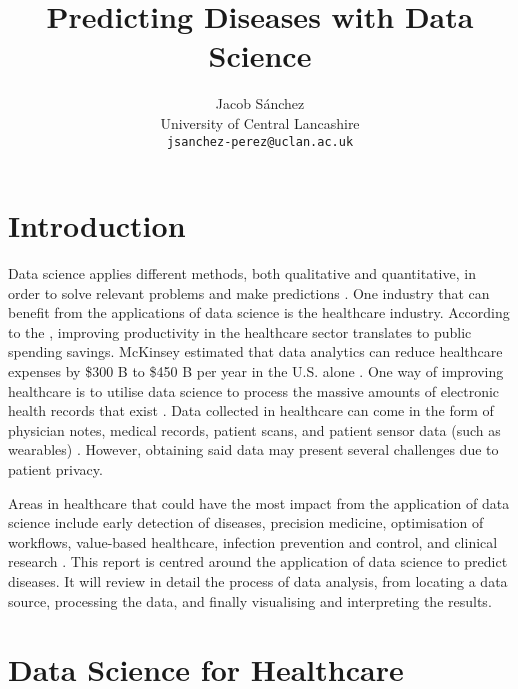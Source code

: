 \documentclass[a4paper,12pt]{article}
\title{Predicting Diseases with Data Science}
\author{Jacob Sánchez\\ University of Central Lancashire\\\texttt{jsanchez-perez@uclan.ac.uk}}
\date{}
\begin{document}
\maketitle


\section{Introduction}



Data science applies different methods, both qualitative and quantitative, in order to solve relevant problems and make predictions \parencite[78]{Waller2013}.
One industry that can benefit from the applications of data science is the healthcare industry.
According to the \textcite{oecd2010health}, improving productivity in the healthcare sector translates to public spending savings.
McKinsey estimated that data analytics can reduce healthcare expenses by \$300 B to \$450 B per year in the U.S. alone \parencite{Groves2013}.
One way of improving healthcare is to utilise data science to process the massive amounts of electronic health records that exist \parencite{Dalianis2015}.
Data collected in healthcare can come in the form of physician notes, medical records, patient scans, and patient sensor data (such as wearables) \parencite{Adam2017}.
However, obtaining said data may present several challenges due to patient privacy. 

Areas in healthcare that could have the most impact from the application of data science include early detection of diseases, precision medicine, optimisation of workflows, value-based healthcare, infection prevention and control, and clinical research \parencite[9]{Consoli2019}.
This report is centred around the application of data science to predict diseases.
It will review in detail the process of data analysis, from locating a data source, processing the data, and finally visualising and interpreting the results.

\section{Data Science for Healthcare}

\end{document}
